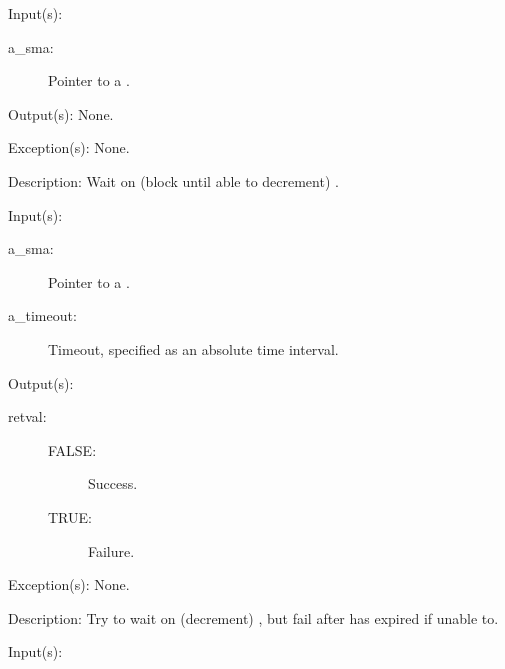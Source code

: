 \begin{capi}
\label{sma_wait}
	\begin{capilist}
	\item[Input(s): ]
		\begin{description}\item[]
		\item[a\_sma: ]
			Pointer to a .
		\end{description}
	\item[Output(s): ] None.
	\item[Exception(s): ] None.
	\item[Description: ]
		Wait on (block until able to decrement) .
	\end{capilist}
\label{sma_timedwait}
	\begin{capilist}
	\item[Input(s): ]
		\begin{description}\item[]
		\item[a\_sma: ]
			Pointer to a \classname{sma}.
		\item[a\_timeout: ]
			Timeout, specified as an absolute time interval.
		\end{description}
	\item[Output(s): ]
		\begin{description}\item[]
		\item[retval: ]
			\begin{description}\item[]
			\item[FALSE: ] Success.
			\item[TRUE: ] Failure.
			\end{description}
		\end{description}
	\item[Exception(s): ] None.
	\item[Description: ]
		Try to wait on (decrement) , but fail after
		 has expired if unable to.
	\end{capilist}
\label{sma_trywait}
	\begin{capilist}
	\item[Input(s): ]
		\begin{description}\item[]

\end{description}
\end{capilist}
\end{capi}
